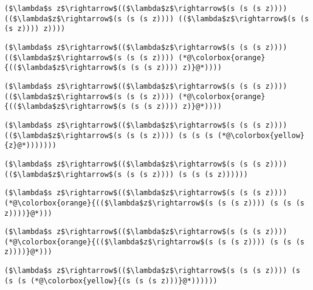\documentclass{beamer}
\begin{document}
\begin{frame}[fragile]{\CurrentSection}
\lstset{basicstyle=\ttfamily\small}\lstset{numbers=none}\lstset{language=ML}\begin{lstlisting}
($\lambda$s z$\rightarrow$(($\lambda$z$\rightarrow$(s (s (s z)))) (($\lambda$z$\rightarrow$(s (s (s z)))) (($\lambda$z$\rightarrow$(s (s (s z)))) z))))
\end{lstlisting}
\pause\lstset{language=ML}\begin{lstlisting}
($\lambda$s z$\rightarrow$(($\lambda$z$\rightarrow$(s (s (s z)))) (($\lambda$z$\rightarrow$(s (s (s z)))) (*@\colorbox{orange}{(($\lambda$z$\rightarrow$(s (s (s z)))) z)}@*))))
\end{lstlisting}

\end{frame}

\begin{frame}[fragile]{\CurrentSection}
\lstset{basicstyle=\ttfamily\small}\lstset{numbers=none}\lstset{language=ML}\begin{lstlisting}
($\lambda$s z$\rightarrow$(($\lambda$z$\rightarrow$(s (s (s z)))) (($\lambda$z$\rightarrow$(s (s (s z)))) (*@\colorbox{orange}{(($\lambda$z$\rightarrow$(s (s (s z)))) z)}@*))))
\end{lstlisting}
\pause\lstset{language=ML}\begin{lstlisting}
($\lambda$s z$\rightarrow$(($\lambda$z$\rightarrow$(s (s (s z)))) (($\lambda$z$\rightarrow$(s (s (s z)))) (s (s (s (*@\colorbox{yellow}{z}@*)))))))
\end{lstlisting}

\end{frame}

\begin{frame}[fragile]{\CurrentSection}
\lstset{basicstyle=\ttfamily\small}\lstset{numbers=none}\lstset{language=ML}\begin{lstlisting}
($\lambda$s z$\rightarrow$(($\lambda$z$\rightarrow$(s (s (s z)))) (($\lambda$z$\rightarrow$(s (s (s z)))) (s (s (s z))))))
\end{lstlisting}
\pause\lstset{language=ML}\begin{lstlisting}
($\lambda$s z$\rightarrow$(($\lambda$z$\rightarrow$(s (s (s z)))) (*@\colorbox{orange}{(($\lambda$z$\rightarrow$(s (s (s z)))) (s (s (s z))))}@*)))
\end{lstlisting}

\end{frame}

\begin{frame}[fragile]{\CurrentSection}
\lstset{basicstyle=\ttfamily\small}\lstset{numbers=none}\lstset{language=ML}\begin{lstlisting}
($\lambda$s z$\rightarrow$(($\lambda$z$\rightarrow$(s (s (s z)))) (*@\colorbox{orange}{(($\lambda$z$\rightarrow$(s (s (s z)))) (s (s (s z))))}@*)))
\end{lstlisting}
\pause\lstset{language=ML}\begin{lstlisting}
($\lambda$s z$\rightarrow$(($\lambda$z$\rightarrow$(s (s (s z)))) (s (s (s (*@\colorbox{yellow}{(s (s (s z)))}@*))))))
\end{lstlisting}

\end{frame}
\end{document}
